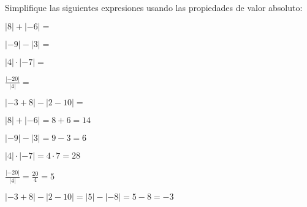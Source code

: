 \begin{exercise}
\problem Simplifique las siguientes expresiones usando las propiedades de valor absoluto:

\begin{exerciselist}
    \item $|8| + |-6| = $ \underline{\hspace{4cm}}
    \item $|-9| - |3| = $ \underline{\hspace{4cm}}
    \item $|4| \cdot |-7| = $ \underline{\hspace{4cm}}
    \item $\frac{|-20|}{|4|} = $ \underline{\hspace{4cm}}
    \item $|-3 + 8| - |2 - 10| = $ \underline{\hspace{4cm}}
\end{exerciselist}

\begin{solucion}
\begin{exerciselist}
    \item $|8| + |-6| = 8 + 6 = 14$
    \item $|-9| - |3| = 9 - 3 = 6$
    \item $|4| \cdot |-7| = 4 \cdot 7 = 28$
    \item $\frac{|-20|}{|4|} = \frac{20}{4} = 5$
    \item $|-3 + 8| - |2 - 10| = |5| - |-8| = 5 - 8 = -3$
\end{exerciselist}
\end{solucion}
\end{exercise}

